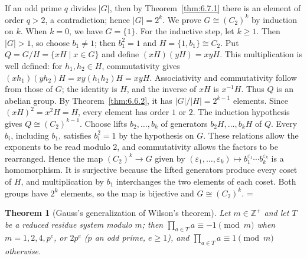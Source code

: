\documentclass[11pt]{article}
\makeatletter
\theoremstyle{ntstyle}
\newtheorem{theorem}{Theorem}[subsection]
\let\nt@closedisplay\]
\def\nt@guardedclose{\@ifnextchar\par{\nt@closeafterpar}{\@ifnextchar\end{\postdisplaypenalty\@M\nt@closedisplay}{\nt@closedisplay}}}
\def\nt@closeafterpar\par{\@ifnextchar\par{\nt@closeafterpar}{\@ifnextchar\end{\postdisplaypenalty\@M\nt@closedisplay\par}{\nt@closedisplay\par}}}
\renewenvironment{proof}[1][\proofname]{\par
  \pushQED{\qed}\normalfont\topsep\medskipamount\edef\nt@afterproof{\@endparpenalty=\the\@endparpenalty\relax}\@beginparpenalty\@M\@endparpenalty\@M\let\]\nt@guardedclose\trivlist\item[]\textit{#1\@addpunct{.}} \ignorespaces}{\ifvmode\addpenalty\@M\fi\popQED\nt@afterproof\endtrivlist\@endpefalse}
\makeatother
\begin{document}
\begin{proof} If an odd prime $q$ divides $|G|$, then by
	Theorem~\ref{thm:6.7.1} there is an element of order $q > 2$, a contradiction;
	hence $|G| = 2^{k}$. We prove $G \cong (C_2)^{k}$ by induction on
	$k$. When $k = 0$, we have $G = \{1\}$. For the inductive step, let
	$k\ge1$. Then $|G|>1$, so choose $b_1\neq
		1$; then $b_1^2=1$ and $H = \{1, b_1\} \cong C_2$. Put
	$Q=G/H=\{xH\mid x\in G\}$ and define $(xH)(yH)=xyH$.
	This multiplication is well defined: for $h_1,h_2\in H$, commutativity gives
	$(xh_1)(yh_2)H=xy(h_1h_2)H=xyH$.
	Associativity and commutativity follow from those of $G$; the identity is
	$H$, and the inverse of $xH$ is $x^{-1}H$. Thus $Q$ is an abelian group.
	By Theorem~\ref{thm:6.6.2}, it has $|G|/|H|=2^{k-1}$ elements.
	Since $(xH)^2=x^2H=H$, every element has order $1$ or $2$.
	The induction hypothesis gives $Q\cong(C_2)^{k-1}$.
	Choose lifts $b_2,\ldots,b_k$ of generators $b_2H,\ldots,b_kH$ of $Q$.
	Every $b_i$, including $b_1$, satisfies $b_i^2=1$ by the hypothesis on $G$.
	These relations allow the exponents to be read modulo $2$, and commutativity
	allows the factors to be rearranged. Hence the map $(C_2)^k\to G$ given by
	$(\varepsilon_1,\ldots,\varepsilon_k)\mapsto b_1^{\varepsilon_1}\cdots b_k^{\varepsilon_k}$
	is a homomorphism. It is surjective because the lifted generators produce
	every coset of $H$, and multiplication by $b_1$ interchanges the two elements
	of each coset. Both groups have $2^k$ elements, so the map is bijective and
	$G\cong(C_2)^k$.
\end{proof}
\begin{theorem}[Gauss's generalization of Wilson's theorem]\label{thm:6.7.3} Let $m\in\mathbb{Z}^+$ and let $T$ be a reduced residue system modulo $m$; then
	$\prod_{a \in T} a \equiv -1 \pmod{m}$ when $m = 1, 2, 4, p^{e}$, or $2
		p^{e}$ ($p$ an odd prime, $e \ge 1$), and $\prod_{a \in T} a \equiv 1 \pmod{m}$ otherwise.
\end{theorem}
\end{document}
